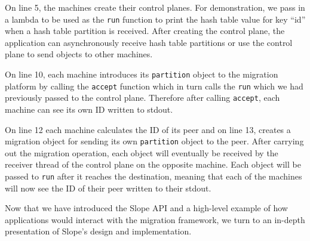 On line 5, the machines create their
control planes. For demonstration, we pass in a lambda to be used
as the \texttt{run}
function to print the hash table value for key ``id'' when a hash table
partition is received. After creating the control plane, the application can
asynchronously receive hash table partitions or use the control plane to
send objects to other machines.

On line 10, each machine introduces its \texttt{partition} object to the
migration platform by calling the \texttt{accept} function which in turn calls
the \texttt{run} which we had previously passed to the control plane. Therefore
after calling \texttt{accept}, each machine can see its own ID written to stdout.

On line 12 each machine calculates the ID of its peer and on line 13, creates
a migration object for sending
its own \texttt{partition} object to the peer. After carrying out the migration
operation, each object will eventually be
received by the receiver thread of the control plane on the opposite machine.
Each object will be passed to \texttt{run} after it reaches the destination,
meaning that each of the machines will now see the ID of their peer written
to their stdout.

Now that we have introduced the Slope API and a high-level example of how
applications would interact with the migration framework, we turn to an
in-depth presentation of Slope's design and implementation.
